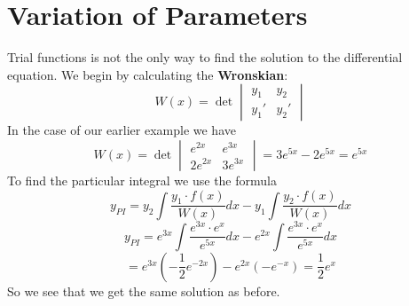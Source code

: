 \documentclass[12pt]{article}
\begin{document}
\break
\section*{Variation of Parameters}
Trial functions is not the only way to find the solution to the differential 
equation.
We begin by calculating the \textbf{Wronskian}: 
\[ 
    W(x) = \det 
    \begin{vmatrix}
        y_1  & y_2 \\ 
        y_1' & y_2'
    \end{vmatrix}
\]
In the case of our earlier example we have 
\[ 
    W(x) = \det
    \begin{vmatrix} 
        e^{2x} & e^{3x} \\ 
        2e^{2x} & 3e^{3x}
    \end{vmatrix} 
    = 3e^{5x} - 2e^{5x} = e^{5x}
\]
To find the particular integral we use the formula 
\[ 
    y_{PI} = y_2 \displaystyle\int \frac{y_1 \cdot f(x)}{W(x)}dx - 
    y_1 \displaystyle\int \frac{y_2 \cdot f(x)}{W(x)}dx
\]
\[ 
    y_{PI} = e^{3x} \displaystyle\int \frac{e^{3x} \cdot e^x}{e^{5x}}dx - 
    e^{2x} \displaystyle\int \frac{e^{3x} \cdot e^x}{e^{5x}}dx
\]
\[ 
    = e^{3x}\left(-\frac{1}{2}e^{-2x}\right)-e^{2x}\left(-e^{-x}\right)
    = \frac{1}{2}e^{x}
\]
So we see that we get the same solution as before.
\end{document}
